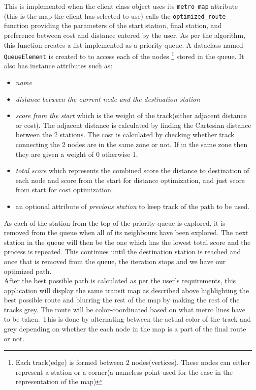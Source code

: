 \documentclass[fontsize=11pt]{article}
\begin{document}
    This is implemented when the client class object uses its \texttt{metro\_map} attribute (this is the map the client has selected to use) calls the \texttt{optimized\_route} function providing the parameters of the start station, final station, and preference between cost and distance entered by the user. As per the algorithm, this function creates a list implemented as a priority queue. A dataclass named \texttt{QueueElement} is created to to access each of the nodes \footnote{Each track(edge) is formed between 2 nodes(vertices). These nodes can either represent a station or a corner(a nameless point used for the ease in the representation of the map)} stored in the queue. It also has instance attributes such as:
    \begin{itemize}
        \item  \textit{name}
        \item \textit{distance between the current node and the destination station }
        \item \textit{score from the start} which is the weight of the track(either adjacent distance or cost). The adjacent distance is calculated by finding the Cartesian distance between the 2 stations. The cost is calculated by checking whether track connecting the 2 nodes are in the same zone or not. If in the same zone then they are given a weight of 0 otherwise 1.
        \item \textit{total score} which represents the combined score the distance to destination of each node and score from the start for distance optimization, and just score from start for cost optimization. 
        \item an optional attribute of \textit{previous station} to keep track of the path to be used.
    \end{itemize}
    As each of the station from the top of the priority queue is explored, it is removed from the queue when all of its neighbours have been explored. The next station in the queue will then be the one which has the lowest total score and the process is repeated. This continues until the destination station is reached and once that is removed from the queue, the iteration stops and we have our optimized path.
    \\
    After the best possible path is calculated as per the user's requirements, this application will display the same transit map as described above highlighting the best possible route and blurring the rest of the map by making the rest of the tracks grey. The route will be color-coordinated based on what metro lines have to be taken. This is done by alternating between the actual color of the track and grey depending on whether the each node in the map is a part of the final route or not.
\end{document}
